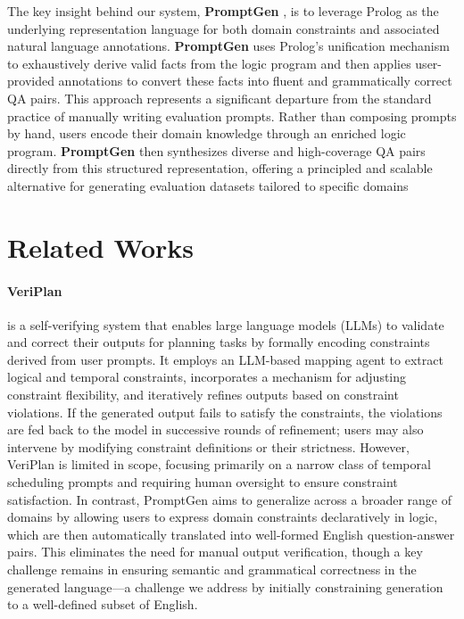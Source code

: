 \documentclass{article}
\newcommand{\PromptGen}{
    {\bfseries PromptGen}
}
\begin{document}
The key insight behind our system, \PromptGen, is to leverage Prolog as the underlying 
representation language for both domain constraints and associated natural language 
annotations. \PromptGen uses Prolog’s unification mechanism to exhaustively derive valid 
facts from the logic program and then applies user-provided annotations to convert these 
facts into fluent and grammatically correct QA pairs. This approach represents a 
significant departure from the standard practice of manually writing evaluation prompts. 
Rather than composing prompts by hand, users encode their domain knowledge through an 
enriched logic program. \PromptGen then synthesizes diverse and high-coverage QA pairs 
directly from this structured representation, offering a principled and scalable 
alternative for generating evaluation datasets tailored to specific domains

\section{Related Works}

\paragraph{VeriPlan \cite{Lee_2025}} is a self-verifying system that enables large language models (LLMs) 
to validate and correct their outputs for planning tasks by formally encoding constraints 
derived from user prompts. It employs an LLM-based mapping agent to extract logical and 
temporal constraints, incorporates a mechanism for adjusting constraint flexibility, 
and iteratively refines outputs based on constraint violations. If the generated output 
fails to satisfy the constraints, the violations are fed back to the model in successive 
rounds of refinement; users may also intervene by modifying constraint definitions or 
their strictness. However, VeriPlan is limited in scope, focusing primarily on a narrow 
class of temporal scheduling prompts and requiring human oversight to ensure constraint 
satisfaction. In contrast, PromptGen aims to generalize across a broader range of domains 
by allowing users to express domain constraints declaratively in logic, which are then 
automatically translated into well-formed English question-answer pairs. This eliminates 
the need for manual output verification, though a key challenge remains in ensuring 
semantic and grammatical correctness in the generated language—a challenge we address 
by initially constraining generation to a well-defined subset of English.
\end{document}
